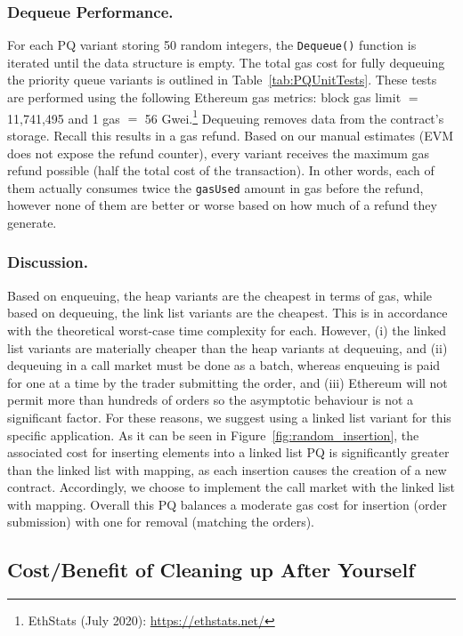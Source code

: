 \subsubsection{Dequeue Performance.} For each PQ variant storing 50 random integers, the \texttt{Dequeue()} function is iterated until the data structure is empty. The total gas cost for fully dequeuing the priority queue variants is outlined in Table~\ref{tab:PQUnitTests}. These tests are performed using the following Ethereum gas metrics: block gas limit $=$11,741,495 and 1 gas $=$ 56 Gwei.\footnote{EthStats (July 2020): \url{https://ethstats.net/}} Dequeuing removes data from the contract's storage. Recall this results in a gas refund. Based on our manual estimates (EVM does not expose the refund counter), every variant receives the maximum gas refund possible (\ie half the total cost of the transaction). In other words, each of them actually consumes twice the \texttt{gasUsed} amount in gas before the refund, however none of them are better or worse based on how much of a refund they generate.  

\subsubsection{Discussion.} Based on enqueuing, the heap variants are the cheapest in terms of gas, while based on dequeuing, the link list variants are the cheapest. This is in accordance with the theoretical worst-case time complexity for each. However, (i) the linked list variants are materially cheaper than the heap variants at dequeuing, and (ii) dequeuing in a call market must be done as a batch, whereas enqueuing is paid for one at a time by the trader submitting the order, and (iii) Ethereum will not permit more than hundreds of orders so the asymptotic behaviour is not a significant factor. For these reasons, we suggest using a linked list variant for this specific application. As it can be seen in Figure~\ref{fig:random_insertion}, the associated cost for inserting elements into a linked list PQ is significantly greater than the linked list with mapping, as each insertion causes the creation of a new contract. Accordingly, we choose to implement the call market with the linked list with mapping. Overall this PQ balances a moderate gas cost for insertion (\ie order submission) with one for removal (\ie matching the orders). 


\subsection{Cost/Benefit of Cleaning up After Yourself}
\label{sec:gasrefund}

